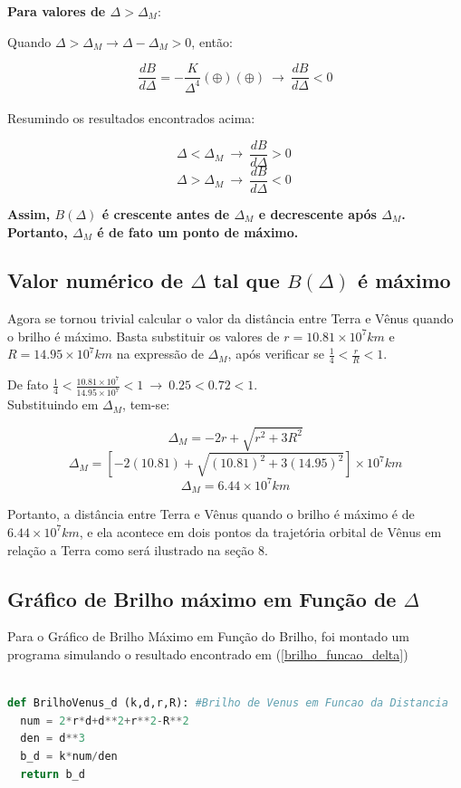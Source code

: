 \documentclass[a4paper, 12pt]{article}
\begin{document}
\textbf{Para valores de $\Delta >\Delta _M$}:

Quando $\Delta >\Delta _M\longrightarrow \Delta -\Delta _M>0$, então:

$$\frac{dB}{d\Delta }=-\frac{K}{\Delta ^4}\left(\oplus \right)\left(\oplus \right)\ \longrightarrow \ \frac{dB}{d\Delta }<0$$\\

Resumindo os resultados encontrados acima:

$$\Delta <\Delta _M\ \longrightarrow \boxed{\ \frac{dB}{d\Delta }>0\ }$$
$$\Delta >\Delta _M\ \longrightarrow \boxed{\ \frac{dB}{d\Delta }<0\ }$$

\textbf{Assim, $B\left(\Delta \right)$ é crescente antes de $\Delta _M$ e decrescente após $\Delta _M$. Portanto, $\Delta _M$ é de fato um ponto de máximo.}

\subsection{Valor numérico de $\Delta$ tal que $B\left(\Delta \right)$ é máximo}

Agora se tornou trivial calcular o valor da distância entre Terra e Vênus quando o brilho é máximo. Basta substituir os valores de $r=10.81\times 10^7km$ e $R=14.95\times 10^7km$ na expressão de $\Delta_M$, após verificar se $\frac{1}{4}<\frac{r}{R}<1$.

De fato $\frac{1}{4}<\frac{10.81\times 10^7}{14.95\times 10^7}<1\ \longrightarrow \ 0.25<0.72<1$.\\

Substituindo em $\Delta_M$, tem-se:

$$\Delta _M=-2r+\sqrt{r^2+3R^2}$$
$$\Delta _M=\left[-2\left(10.81\right)+\sqrt{\left(10.81\right)^2+3\left(14.95\right)^2}\right]\times 10^7km$$
$$\boxed{\ \Delta _M=6.44\times 10^7km\ }$$

Portanto, a distância entre Terra e Vênus quando o brilho é máximo é de $6.44\times 10^7km$, e ela acontece em dois pontos da trajetória orbital de Vênus em relação a Terra como será ilustrado na seção 8.

\subsection{Gráfico de Brilho máximo em Função de $\Delta$}

Para o Gráfico de Brilho Máximo em Função do Brilho, foi montado um programa simulando o resultado encontrado em (\ref{brilho_funcao_delta}) 
\begin{lstlisting}[language=Python, caption=Brilho de Vênus ($\Delta$), label=listing_B(delta)] 

def BrilhoVenus_d (k,d,r,R): #Brilho de Venus em Funcao da Distancia
  num = 2*r*d+d**2+r**2-R**2
  den = d**3
  b_d = k*num/den
  return b_d

\end{lstlisting}
\end{document}

